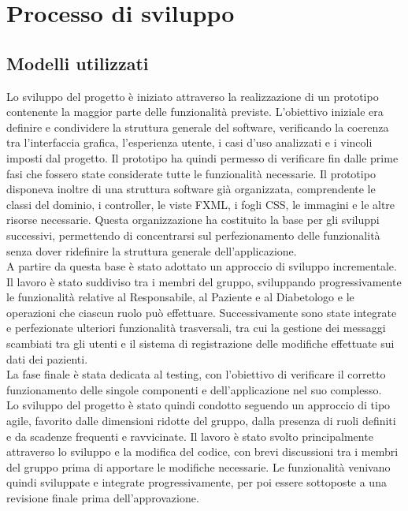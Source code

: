 \section{Processo di sviluppo}

\subsection{Modelli utilizzati}

Lo sviluppo del progetto è iniziato attraverso la realizzazione di un prototipo contenente la maggior parte delle funzionalità previste. L'obiettivo iniziale era definire e condividere la struttura generale del software, verificando la coerenza tra l'interfaccia grafica, l'esperienza utente, i casi d'uso analizzati e i vincoli imposti dal progetto. Il prototipo ha quindi permesso di verificare fin dalle prime fasi che fossero state considerate tutte le funzionalità necessarie.
Il prototipo disponeva inoltre di una struttura software già organizzata, comprendente le classi del dominio, i controller, le viste FXML, i fogli CSS, le immagini e le altre risorse necessarie. Questa organizzazione ha costituito la base per gli sviluppi successivi, permettendo di concentrarsi sul perfezionamento delle funzionalità senza dover ridefinire la struttura generale dell'applicazione.\\

A partire da questa base è stato adottato un approccio di sviluppo incrementale. Il lavoro è stato suddiviso tra i membri del gruppo, sviluppando progressivamente le funzionalità relative al Responsabile, al Paziente e al Diabetologo e le operazioni che ciascun ruolo può effettuare. Successivamente sono state integrate e perfezionate ulteriori funzionalità trasversali, tra cui la gestione dei messaggi scambiati tra gli utenti e il sistema di registrazione delle modifiche effettuate sui dati dei pazienti.\\
La fase finale è stata dedicata al testing, con l'obiettivo di verificare il corretto funzionamento delle singole componenti e dell'applicazione nel suo complesso.\\

Lo sviluppo del progetto è stato quindi condotto seguendo un approccio di tipo agile, favorito dalle dimensioni ridotte del gruppo, dalla presenza di ruoli definiti e da scadenze frequenti e ravvicinate. Il lavoro è stato svolto principalmente attraverso lo sviluppo e la modifica del codice, con brevi discussioni tra i membri del gruppo prima di apportare le modifiche necessarie. Le funzionalità venivano quindi sviluppate e integrate progressivamente, per poi essere sottoposte a una revisione finale prima dell'approvazione.



